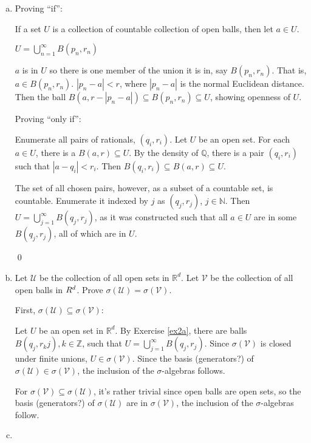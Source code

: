 \documentclass[11pt,oneside]{article}
\numberwithin{equation}{section}
\theoremstyle{definition}
\newtheorem{exercise}{Exercise}
\def\RR{\mathbb{R}}
\def\QQ{\mathbb{Q}}
\def\ZZ{\mathbb{Z}}
\def\NN{\mathbb{N}}
\def\fancyU{\mathscr{U}}
\def\fancyV{\mathscr{V}}
\begin{document}
\begin{solution}
  \begin{enumerate}[(a)]
  \item
    \label{ex2a}
    Proving ``if'':
    

    If a set $U$ is a collection of countable collection of open balls, then let
    $a \in U$.

    $U = \bigcup \limits _{n=1} ^ {\infty} B(p_n, r_n)$

    $a$ is in $U$ so there is one member of the union it is in, say
    $B(p_n, r_n)$.  That is, $ a \in B(p_n, r_n)$.  $|p_n - a| < r$,
    where $| p_n - a| $ is the normal Euclidean distance.  Then the
    ball $B(a, r - |p_n - a|) \subseteq B(p_n, r_n) \subseteq U$,
    showing openness of $U$.

    Proving ``only if'':

    Enumerate all pairs of rationals, $(q_i, r_i)$.  Let $U$ be an
    open set.  For each $a \in U$, there is a $B(a, r) \subseteq U$.
    By the density of $\QQ$, there is a pair $(q_i, r_i)$ such that
    $|a-q_i| < r_i$. Then $B(q_i, r_i) \subseteq B(a, r) \subseteq U$.  

    The set of all chosen pairs, however, as a subset of a countable
    set, is countable. Enumerate it indexed by $j$ as $(q_j, r_j)$,
    $j \in \NN$.  Then $U = \bigcup \limits _{j=1} ^ \infty B(q_j,
    r_j)$, as it was constructed such that all $a \in U$ are in some
    $B(q_j, r_j)$, all of which are in $U$.

    \qed
  \item
    Let $\fancyU$ be the collection of all open sets in $\RR^d$. Let
    $\fancyV$ be the collection of all open balls in $\\R^d$.  Prove
    $\sigma(\fancyU) = \sigma(\fancyV)$.

    First, $\sigma(\fancyU) \subseteq \sigma(\fancyV)$:

    Let $U$ be an open set in $\RR^d$.  By Exercise \ref{ex2a}, there
    are balls $B(q_j, r_kj), k \in \ZZ$, such that $U = \bigcup
    \limits _ {j=1}^\infty B(q_j, r_j)$.  Since $\sigma(\fancyV)$ is
    closed under finite unions, $U \in \sigma(\fancyV)$.  Since the
    basis (generators?) of $\sigma(\fancyU) \in \sigma(\fancyV)$,
    the inclusion of the $\sigma$-algebras follows.

    For $\sigma(\fancyV) \subseteq \sigma(\fancyU)$, it's rather
    trivial since open balls are open sets, so the basis (generators?)
    of $\sigma(\fancyU)$ are in $\sigma(\fancyV)$, the inclusion of
    the $\sigma$-algebras follow.

  \item
    

    

    
  \end{enumerate}
\end{solution}

\begin{comment}
\begin{exercise}
  problem
\end{exercise}
\begin{solution}
\begin{enumerate}[(a)]
\item
  first answer
\end{enumerate}
\end{solution}
\end{comment}
\end{document}
